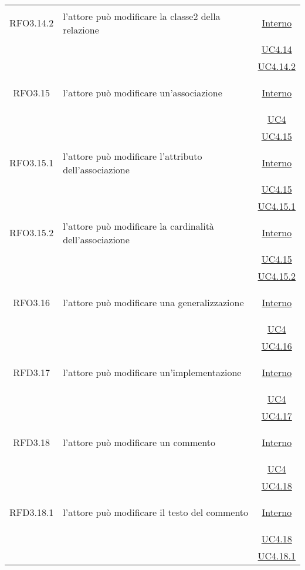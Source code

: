 \begin{longtable}{|c|>{\centering}m{7cm}|c|}
\hypertarget{RFO3.14.2}{RFO3.14.2} & l'attore può modificare la classe2 della relazione &  \hyperlink{Interno}{Interno}\\
& &\hyperref[UC4.14]{UC4.14}\\
& &\hyperref[UC4.14.2]{UC4.14.2}\\ \hline

\hypertarget{RFO3.15}{RFO3.15} & l'attore può modificare un'associazione &  \hyperlink{Interno}{Interno}\\
& &\hyperref[UC4]{UC4}\\
& &\hyperref[UC4.15]{UC4.15}\\ \hline

\hypertarget{RFO3.15.1}{RFO3.15.1} & l'attore può modificare l'attributo dell'associazione &  \hyperlink{Interno}{Interno}\\
& &\hyperref[UC4.15]{UC4.15}\\
& &\hyperref[UC4.15.1]{UC4.15.1}\\ \hline

\hypertarget{RFO3.15.2}{RFO3.15.2} & l'attore può modificare la cardinalità dell'associazione &  \hyperlink{Interno}{Interno}\\
& &\hyperref[UC4.15]{UC4.15}\\
& &\hyperref[UC4.15.2]{UC4.15.2}\\ \hline

\hypertarget{RFO3.16}{RFO3.16} & l'attore può modificare una generalizzazione &  \hyperlink{Interno}{Interno}\\
& &\hyperref[UC4]{UC4}\\
& &\hyperref[UC4.16]{UC4.16}\\ \hline

\hypertarget{RFD3.17}{RFD3.17} & l'attore può modificare un'implementazione &  \hyperlink{Interno}{Interno}\\
& &\hyperref[UC4]{UC4}\\
& &\hyperref[UC4.17]{UC4.17}\\ \hline

\hypertarget{RFD3.18}{RFD3.18} & l'attore può modificare un commento &  \hyperlink{Interno}{Interno}\\
& &\hyperref[UC4]{UC4}\\
& &\hyperref[UC4.18]{UC4.18}\\ \hline

\hypertarget{RFD3.18.1}{RFD3.18.1} & l'attore può modificare il testo del commento &  \hyperlink{Interno}{Interno}\\
& &\hyperref[UC4.18]{UC4.18}\\
& &\hyperref[UC4.18.1]{UC4.18.1}\\ \hline


\end{longtable}
